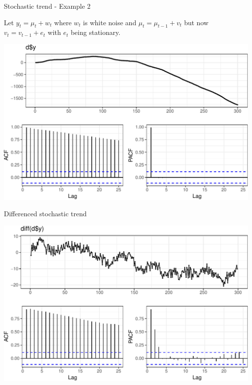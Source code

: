 \documentclass[11pt,ignorenonframetext,]{beamer}
\newenvironment{Shaded}{}{}
\newcommand{\KeywordTok}[1]{\textcolor[rgb]{0.00,0.44,0.13}{\textbf{#1}}}
\newcommand{\NormalTok}[1]{#1}
\newcommand{\OperatorTok}[1]{\textcolor[rgb]{0.40,0.40,0.40}{#1}}
\let\oldShaded\Shaded
\let\endoldShaded\endShaded
\renewenvironment{Shaded}{\footnotesize\begin{spacing}{0.9}\oldShaded}{\endoldShaded\end{spacing}}
\begin{document}
\begin{frame}[t]{%
\protect\hypertarget{stochastic-trend---example-2}{%
Stochastic trend - Example 2}}

Let \(y_t = \mu_t + w_t\) where \(w_t\) is white noise and
\(\mu_t = \mu_{t-1} + v_t\) but now \(v_t = v_{t-1} + e_t\) with \(e_t\)
being stationary.

\begin{center}\includegraphics[width=\textwidth]{Lec09_files/figure-beamer/unnamed-chunk-3-1} \end{center}

\end{frame}

\begin{frame}[fragile]{%
\protect\hypertarget{differenced-stochastic-trend-1}{%
Differenced stochastic trend}}

\begin{Shaded}
\end{Shaded}

\begin{center}\includegraphics[width=\textwidth]{Lec09_files/figure-beamer/unnamed-chunk-4-1} \end{center}

\end{frame}
\end{document}
